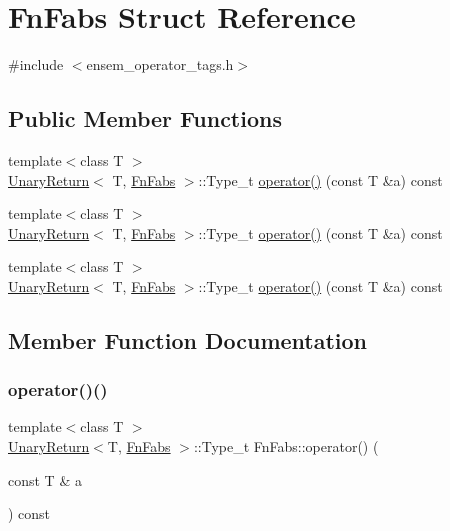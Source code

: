 \hypertarget{structFnFabs}{}\section{Fn\+Fabs Struct Reference}
\label{structFnFabs}


{\ttfamily \#include $<$ensem\+\_\+operator\+\_\+tags.\+h$>$}

\subsection*{Public Member Functions}
\begin{DoxyCompactItemize}
\item 
{\footnotesize template$<$class T $>$ }\\\mbox{\hyperlink{structUnaryReturn}{Unary\+Return}}$<$ T, \mbox{\hyperlink{structFnFabs}{Fn\+Fabs}} $>$\+::Type\+\_\+t \mbox{\hyperlink{structFnFabs_a0813fbaa7b8028c3880585e4095fd2ca}{operator()}} (const T \&a) const
\item 
{\footnotesize template$<$class T $>$ }\\\mbox{\hyperlink{structUnaryReturn}{Unary\+Return}}$<$ T, \mbox{\hyperlink{structFnFabs}{Fn\+Fabs}} $>$\+::Type\+\_\+t \mbox{\hyperlink{structFnFabs_a0813fbaa7b8028c3880585e4095fd2ca}{operator()}} (const T \&a) const
\item 
{\footnotesize template$<$class T $>$ }\\\mbox{\hyperlink{structUnaryReturn}{Unary\+Return}}$<$ T, \mbox{\hyperlink{structFnFabs}{Fn\+Fabs}} $>$\+::Type\+\_\+t \mbox{\hyperlink{structFnFabs_a0813fbaa7b8028c3880585e4095fd2ca}{operator()}} (const T \&a) const
\end{DoxyCompactItemize}


\subsection{Member Function Documentation}
\mbox{\label{structFnFabs_a0813fbaa7b8028c3880585e4095fd2ca}} 
\subsubsection{\texorpdfstring{operator()()}{operator()()}\hspace{0.1cm}{\footnotesize\ttfamily [1/3]}}
{\footnotesize\ttfamily template$<$class T $>$ \\
\mbox{\hyperlink{structUnaryReturn}{Unary\+Return}}$<$T, \mbox{\hyperlink{structFnFabs}{Fn\+Fabs}} $>$\+::Type\+\_\+t Fn\+Fabs\+::operator() (\begin{DoxyParamCaption}\item[{const T \&}]{a }\end{DoxyParamCaption}) const\hspace{0.3cm}{\ttfamily [inline]}}

